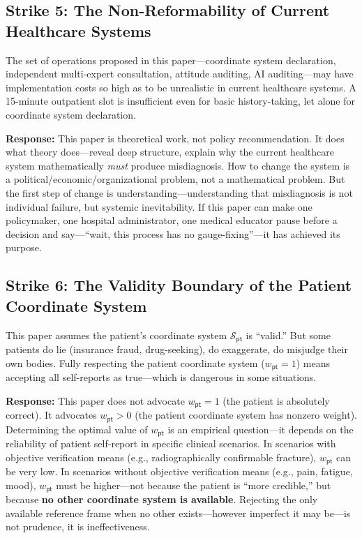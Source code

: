 \documentclass[12pt,a4paper]{article}
\theoremstyle{remark}
\newcommand{\pt}{\textsf{pt}}
\begin{document}
\subsection{Strike 5: The Non-Reformability of Current Healthcare Systems}

The set of operations proposed in this paper---coordinate system declaration, independent multi-expert consultation, attitude auditing, AI auditing---may have implementation costs so high as to be unrealistic in current healthcare systems. A 15-minute outpatient slot is insufficient even for basic history-taking, let alone for coordinate system declaration.

\textbf{Response:} This paper is theoretical work, not policy recommendation. It does what theory does---reveal deep structure, explain why the current healthcare system mathematically \emph{must} produce misdiagnosis. How to change the system is a political/economic/organizational problem, not a mathematical problem. But the first step of change is understanding---understanding that misdiagnosis is not individual failure, but systemic inevitability. If this paper can make one policymaker, one hospital administrator, one medical educator pause before a decision and say---``wait, this process has no gauge-fixing''---it has achieved its purpose.

\subsection{Strike 6: The Validity Boundary of the Patient Coordinate System}

This paper assumes the patient's coordinate system $\mathcal{S}_{\pt}$ is ``valid.'' But some patients do lie (insurance fraud, drug-seeking), do exaggerate, do misjudge their own bodies. Fully respecting the patient coordinate system ($w_{\pt} = 1$) means accepting all self-reports as true---which is dangerous in some situations.

\textbf{Response:} This paper does not advocate $w_{\pt} = 1$ (the patient is absolutely correct). It advocates $w_{\pt} > 0$ (the patient coordinate system has nonzero weight). Determining the optimal value of $w_{\pt}$ is an empirical question---it depends on the reliability of patient self-report in specific clinical scenarios. In scenarios with objective verification means (e.g., radiographically confirmable fracture), $w_{\pt}$ can be very low. In scenarios without objective verification means (e.g., pain, fatigue, mood), $w_{\pt}$ must be higher---not because the patient is ``more credible,'' but because \textbf{no other coordinate system is available}. Rejecting the only available reference frame when no other exists---however imperfect it may be---is not prudence, it is ineffectiveness.
\end{document}
